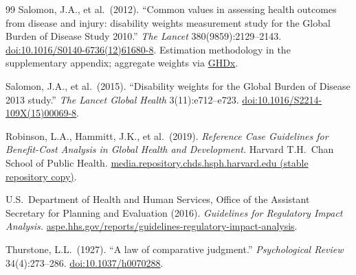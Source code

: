 \documentclass[11pt]{article}
\begin{document}
\begin{thebibliography}{99}
Salomon, J.A., et al.\ (2012).
``Common values in assessing health outcomes from disease and injury: disability weights measurement study for the Global Burden of Disease Study 2010.''
\emph{The Lancet} 380(9859):2129--2143.
\href{https://doi.org/10.1016/S0140-6736(12)61680-8}{doi:10.1016/S0140-6736(12)61680-8}.
Estimation methodology in the supplementary appendix; aggregate weights via \href{https://ghdx.healthdata.org/record/ihme-data/gbd-2010-disability-weights}{GHDx}.

Salomon, J.A., et al.\ (2015).
``Disability weights for the Global Burden of Disease 2013 study.''
\emph{The Lancet Global Health} 3(11):e712--e723.
\href{https://doi.org/10.1016/S2214-109X(15)00069-8}{doi:10.1016/S2214-109X(15)00069-8}.

Robinson, L.A., Hammitt, J.K., et al.\ (2019).
\emph{Reference Case Guidelines for Benefit-Cost Analysis in Global Health and Development.}
Harvard T.H.\ Chan School of Public Health.
\href{https://media.repository.chds.hsph.harvard.edu/static/filer_public/16/3c/163c0d02-1837-4e9b-b88b-d646bbea857c/2019_robinson_ref_case_guidelin_bca_proj_r_126.pdf}{media.repository.chds.hsph.harvard.edu (stable repository copy)}.

U.S.\ Department of Health and Human Services, Office of the Assistant Secretary for Planning and Evaluation (2016).
\emph{Guidelines for Regulatory Impact Analysis.}
\href{https://aspe.hhs.gov/reports/guidelines-regulatory-impact-analysis}{aspe.hhs.gov/reports/guidelines-regulatory-impact-analysis}.

Thurstone, L.L.\ (1927).
``A law of comparative judgment.''
\emph{Psychological Review} 34(4):273--286.
\href{https://doi.org/10.1037/h0070288}{doi:10.1037/h0070288}.
\end{thebibliography}
\end{document}
